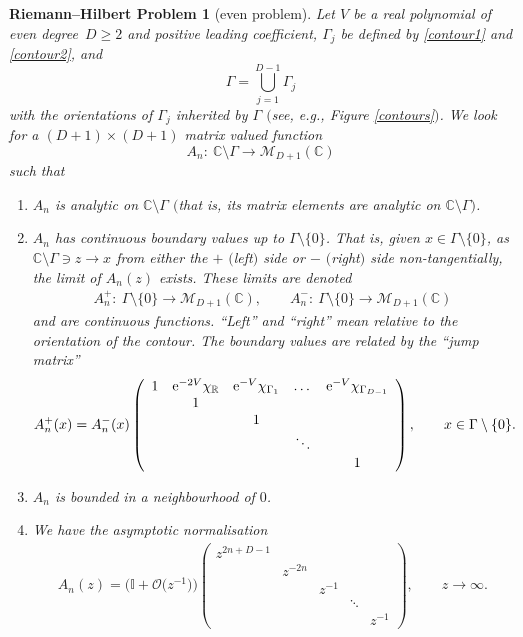 \documentclass[pdftex]{sigma}
\numberwithin{equation}{section}
\newtheorem{rhp}[Theorem]{Riemann--Hilbert Problem}
\begin{document}
\begin{rhp}[even problem]\label{evenrhp} Let $V$ be a real polynomial of even degree~${D \geq 2}$ and positive leading coefficient, $\Gamma_j$ be defined by \eqref{contour1} and \eqref{contour2}, and
\begin{equation}\label{gamma}
\Gamma = \bigcup_{j=1}^{D-1} \Gamma_j
\end{equation}
with the orientations of $\Gamma_j$ inherited by $\Gamma$ $($see, e.g., Figure {\rm\ref{contours}}$)$. We look for a $(D+1) \times (D+1)$ matrix valued function
\begin{equation*}
A_{n} \colon\ \mathbb{C}\setminus \Gamma \longrightarrow \mathcal{M}_{D+1}(\mathbb{C})
\end{equation*}
such that
\begin{enumerate}\itemsep=0pt
\item[$(1)$] $A_{n}$ is analytic on $\mathbb{C}\setminus \Gamma$ $($that is, its matrix elements are analytic on $\mathbb{C}\setminus \Gamma)$.
\item[$(2)$] $A_{n}$ has continuous boundary values up to $\Gamma \setminus \{ 0 \}$. That is, given $x \in \Gamma \setminus \{ 0 \}$, as $\mathbb{C}\setminus \Gamma \ni z \to x$ from either the $+$ $($left$)$ side or $-$ $($right$)$ side non-tangentially, the limit of $A_{n}(z)$ exists. These limits are denoted
\begin{align*}
A_{n}^+ \colon\ \Gamma \setminus \{ 0 \} \longrightarrow \mathcal{M}_{D+1}(\mathbb{C}),\qquad
A_{n}^- \colon\ \Gamma \setminus \{ 0 \} \longrightarrow \mathcal{M}_{D+1}(\mathbb{C})
\end{align*}
and are continuous functions. \enquote{Left} and \enquote{right} mean relative to the orientation of the contour. The boundary values are related by the \enquote{jump matrix}
\begin{align*}
A_{n}^{+}(x) = A_{n}^{-}(x)\left(
\begin{array}{ccccccccccccccccccc}
1 & {\rm e}^{-2V} \chi_\mathbb{R} & {\rm e}^{-V} \chi_{\Gamma_1} & \dots & {\rm e}^{-V} \chi_{\Gamma_{D-1}} \\
& 1 \\
& & 1 \\
& & & \ddots \\
& & & & 1 \\
\end{array} \right), \qquad x \in \Gamma \setminus \{ 0 \}.
\end{align*}
\item[$(3)$] $A_{n}$ is bounded in a neighbourhood of $0$.
\item[$(4)$] We have the asymptotic normalisation
\begin{align*}
A_{n}(z) = \big(\mathbb{I}+ \mathcal{O}\big(z^{-1}\big)\big) \left(\begin{matrix}
z^{2n+D-1} \\
& z^{-2n} \\
& & z^{-1} \\
& & & \ddots \\
& & & & z^{-1}
\end{matrix} \right),\qquad z \to \infty.
\end{align*}
\end{enumerate}
\end{rhp}
\end{document}
